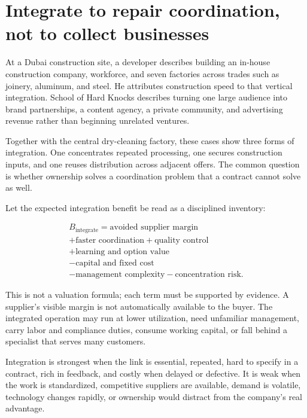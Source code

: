 \section{Integrate to repair coordination, not to collect businesses}

At a Dubai construction site, a developer describes building an in-house
construction company, workforce, and seven factories across trades such as
joinery, aluminum, and steel. He attributes construction speed to that vertical
integration. School of Hard Knocks describes turning one large audience into
brand partnerships, a content agency, a private community, and advertising
revenue rather than beginning unrelated ventures.

Together with the central dry-cleaning factory, these cases show three forms of
integration. One concentrates repeated processing, one secures construction
inputs, and one reuses distribution across adjacent offers. The common question
is whether ownership solves a coordination problem that a contract cannot
solve as well.

Let the expected integration benefit be read as a disciplined inventory:

\begin{equation}
\begin{gathered}
B_{\mathrm{integrate}}=\text{avoided supplier margin}\\
+\text{faster coordination}+\text{quality control}\\
+\text{learning and option value}\\
-\text{capital and fixed cost}\\
-\text{management complexity}-\text{concentration risk}.
\end{gathered}
\end{equation}

This is not a valuation formula; each term must be supported by evidence. A
supplier's visible margin is not automatically available to the buyer. The
integrated operation may run at lower utilization, need unfamiliar management,
carry labor and compliance duties, consume working capital, or fall behind a
specialist that serves many customers.

Integration is strongest when the link is essential, repeated, hard to specify
in a contract, rich in feedback, and costly when delayed or defective. It is
weak when the work is standardized, competitive suppliers are available,
demand is volatile, technology changes rapidly, or ownership would distract
from the company's real advantage.

